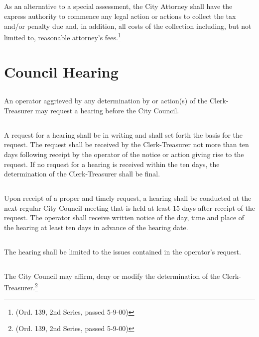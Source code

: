 \subsection{}
As an alternative to a special assessment, the City Attorney shall have the express authority to commence any legal action or actions to collect the tax and/or penalty due and, in addition, all costs of the collection including, but not limited to, reasonable attorney’s fees.\footnote{(Ord. 139, 2nd Series, passed 5-9-00)}

\section{Council Hearing}
\subsection{}
An operator aggrieved by any determination by or action(s) of the Clerk-Treasurer may request a hearing before the City Council.
\subsection{}
A request for a hearing shall be in writing and shall set forth the basis for the request.  The request shall be received by the Clerk-Treasurer not more than ten days following receipt by the operator of the notice or action giving rise to the request.  If no request for a hearing is received within the ten days, the determination of the Clerk-Treasurer shall be final.
\subsection{}
Upon receipt of a proper and timely request, a hearing shall be conducted at the next regular City Council meeting that is held at least 15 days after receipt of the request.  The operator shall receive written notice of the day, time and place of the hearing at least ten days in advance of the hearing date.
\subsection{}
The hearing shall be limited to the issues contained in the operator’s request.
\subsection{}
The City Council may affirm, deny or modify the determination of the Clerk-Treasurer.\footnote{(Ord. 139, 2nd Series, passed 5-9-00)}

